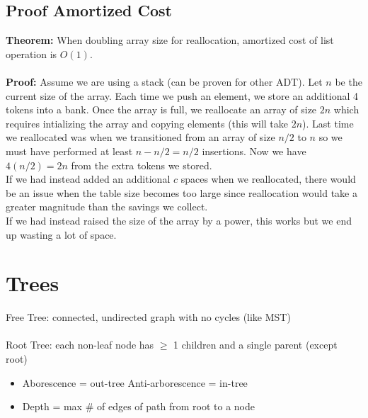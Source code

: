 \documentclass{article}
\begin{document}
  \subsection{Proof Amortized Cost}
  \textbf{Theorem:} When doubling array size for reallocation, amortized cost of list operation is $O(1)$.\\ \\
  \textbf{Proof:} Assume we are using a stack (can be proven for other ADT). Let $n$ be the current size of the array. Each time we push an element, we store an additional 4 tokens into a bank. Once the array is full, we reallocate an array of size $2n$ which requires intializing the array and copying elements (this will take $2n$). Last time we reallocated was when we transitioned from an array of size $n/2$ to $n$ so we must have performed at least $n - n/2 = n/2$ insertions. Now we have $4(n/2) = 2n$ from the extra tokens we stored. \\
  If we had instead added an additional $c$ spaces when we reallocated, there would be an issue when the table size becomes too large since reallocation would take a greater magnitude than the savings we collect.\\
  If we had instead raised the size of the array by a power, this works but we end up wasting a lot of space.
  \newpage
  \noindent\section{Trees}
  Free Tree: connected, undirected graph with no cycles (like MST)\\ \\
  Root Tree: each non-leaf node has $\geq$ 1 children and a single parent (except root)
  \begin{itemize}[noitemsep]
  \item Aborescence = out-tree \quad Anti-arborescence = in-tree 
  \item Depth = max \# of edges of path from root to a node \\
  \end{itemize}
\end{document}
